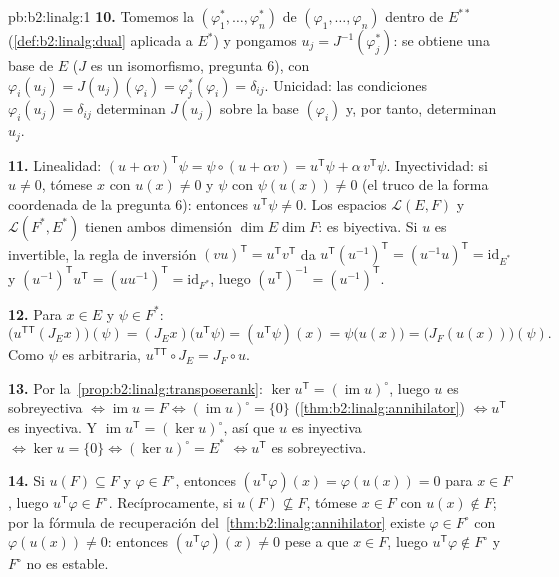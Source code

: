 \begin{solution}{pb:b2:linalg:1}
\textbf{10.} Tomemos la  $(\varphi_1^*, \dots,
\varphi_n^*)$ de $(\varphi_1, \dots, \varphi_n)$ dentro de
$E^{**}$ (\cref{def:b2:linalg:dual} aplicada a $E^*$) y pongamos
$u_j = J^{-1}(\varphi_j^*)$: se obtiene una base de $E$ ($J$ es un
isomorfismo, pregunta 6), con $\varphi_i(u_j) = J(u_j)(\varphi_i)
= \varphi_j^*(\varphi_i) = \delta_{ij}$. Unicidad: las condiciones
$\varphi_i(u_j) = \delta_{ij}$ determinan $J(u_j)$ sobre la base
$(\varphi_i)$ y, por tanto, determinan $u_j$.

\textbf{11.} Linealidad: $(u + \alpha v)^{\mathsf T}\psi = \psi
\circ (u + \alpha v) = u^{\mathsf T}\psi + \alpha\, v^{\mathsf
T}\psi$. Inyectividad: si $u \neq 0$, tómese $x$ con $u(x) \neq 0$
y $\psi$ con $\psi(u(x)) \neq 0$ (el truco de la forma coordenada
de la pregunta 6): entonces $u^{\mathsf T}\psi \neq 0$. Los
espacios $\mathcal{L}(E,F)$ y $\mathcal{L}(F^*, E^*)$ tienen ambos
dimensión $\dim E \dim F$: es biyectiva. Si $u$ es invertible, la
regla de inversión $(vu)^{\mathsf T} = u^{\mathsf T}v^{\mathsf T}$
da $u^{\mathsf T}(u^{-1})^{\mathsf T} = (u^{-1}u)^{\mathsf T} =
\mathrm{id}_{E^*}$ y $(u^{-1})^{\mathsf T}u^{\mathsf T} =
(uu^{-1})^{\mathsf T} = \mathrm{id}_{F^*}$, luego $(u^{\mathsf
T})^{-1} = (u^{-1})^{\mathsf T}$.

\textbf{12.} Para $x \in E$ y $\psi \in F^*$:
\[
\bigl(u^{\mathsf T\mathsf T}(J_E x)\bigr)(\psi)
= (J_E x)\bigl(u^{\mathsf T}\psi\bigr)
= (u^{\mathsf T}\psi)(x)
= \psi\bigl(u(x)\bigr)
= \bigl(J_F(u(x))\bigr)(\psi).
\]
Como $\psi$ es arbitraria, $u^{\mathsf T\mathsf T} \circ J_E = J_F
\circ u$.

\textbf{13.} Por la~\cref{prop:b2:linalg:transposerank}: $\ker
u^{\mathsf T} = (\operatorname{im} u)^\circ$, luego $u$ es
sobreyectiva $\iff \operatorname{im} u = F \iff
(\operatorname{im}u)^\circ = \{0\}$
(\cref{thm:b2:linalg:annihilator}) $\iff u^{\mathsf T}$ es
inyectiva. Y $\operatorname{im} u^{\mathsf T} = (\ker u)^\circ$,
así que $u$ es inyectiva $\iff \ker u = \{0\} \iff (\ker u)^\circ
= E^*$ $\iff u^{\mathsf T}$ es sobreyectiva.

\textbf{14.} Si $u(F) \subseteq F$ y $\varphi \in F^\circ$,
entonces $(u^{\mathsf T}\varphi)(x) = \varphi(u(x)) = 0$ para $x
\in F$, luego $u^{\mathsf T}\varphi \in F^\circ$. Recíprocamente,
si $u(F) \not\subseteq F$, tómese $x \in F$ con $u(x) \notin F$;
por la fórmula de recuperación del~\cref{thm:b2:linalg:annihilator} existe $\varphi \in F^\circ$ con
$\varphi(u(x)) \neq 0$: entonces $(u^{\mathsf T}\varphi)(x) \neq
0$ pese a que $x \in F$, luego $u^{\mathsf T}\varphi \notin
F^\circ$ y $F^\circ$ no es estable.


\end{solution}
